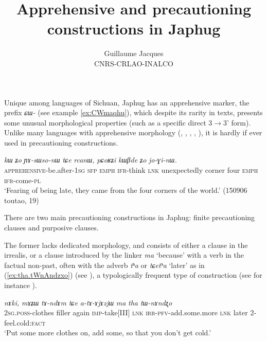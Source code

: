 \documentclass{article}
\newcommand{\ipa}[1]{{\phon\textit{#1}}}
\begin{document}
 
\title{Apprehensive and precautioning constructions in Japhug}
\author{Guillaume Jacques\\ CNRS-CRLAO-INALCO}
\maketitle


Unique among languages of Sichuan, Japhug has an apprehensive marker, the prefix \ipa{ɕɯ-} (see example \ref{ex:CWmaqhu}), which despite its rarity in texts, presents some unusual morphological properties (such as a specific direct 3$\rightarrow$3' form). Unlike many languages with apprehensive morphology (\citealt{lichtenberg95apprehensional}, \citealt{francois03predicat}, \citealt{verstrate05mood}, \citealt{overall09linking}, \citealt{vuillermet18fear}), it is hardly if ever used in precautioning constructions. 

\begin{exe}
\ex \label{ex:CWmaqhu}
\gll  \ipa{ɕɯ-maqhu-a}  \ipa{kɯ} 	\ipa{ʑo} 	\ipa{ɲɤ-sɯso-nɯ} 	\ipa{tɕe} 	\ipa{rcanɯ,} 	\ipa{pɕoʁʑi} 	\ipa{kɯβde} 	\ipa{ʑo} 	\ipa{jo-ɣi-nɯ.}  \\
\textsc{apprehensive}-be.after-\textsc{1sg} \textsc{sfp} \textsc{emph} \textsc{ifr}-think \textsc{lnk} unexpectedly corner four \textsc{emph} \textsc{ifr}-come-\textsc{pl} \\
\glt `Fearing of being late, they came from the four corners of the world.' (150906 toutao, 19)
 \end{exe}

There are two main precautioning constructions in Japhug: finite precautioning clauses and purposive clauses.

The former lacks dedicated morphology, and consists of either a clause in the irrealis, or a clause introduced by the linker \ipa{ma} `because' with a verb in the factual non-past, often with the adverb \ipa{tʰa} or \ipa{tɕetʰa} `later' as in (\ref{ex:tha.tWnAndzxo}) (see \citealt[308]{jacques14linking}), a typologically frequent type of construction (see for instance  \citealt{angelo16beware}).

\begin{exe}
\ex \label{ex:tha.tWnAndzxo}
\gll \ipa{nɤ-ŋga} 	\ipa{nɤki,} 	\ipa{mɤʑɯ} 	\ipa{tɤ-ndɤm} 	\ipa{tɕe} 	\ipa{a-tɤ-ɤjɤzjɯ} 	\ipa{ma} 	\ipa{tha} 	\ipa{tɯ-nɤndʐo} \\
\textsc{2sg}.\textsc{poss}-clothes filler again \textsc{imp}-take[III] \textsc{lnk} \textsc{irr}-\textsc{pfv}-add.some.more \textsc{lnk} later 2-feel.cold:\textsc{fact} \\
\glt `Put some more clothes on, add some, so that you don't get cold.'  
\end{exe}
\end{document}
